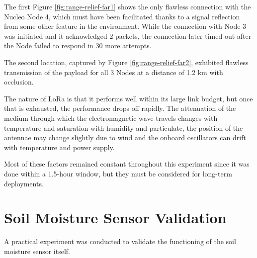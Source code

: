 The first Figure \ref{fig:range-relief-far1} shows the only flawless connection with the Nucleo Node 4, which must have been facilitated thanks to a signal reflection from some other feature in the environment. While the connection with Node 3 was initiated and it acknowledged 2 packets, the connection later timed out after the Node failed to respond in 30 more attempts.

The second location, captured by Figure \ref{fig:range-relief-far2}, exhibited flawless transmission of the payload for all 3 Nodes at a distance of 1.2 km with occlusion.

The nature of LoRa is that it performs well within its large link budget, but once that is exhausted, the performance drops off rapidly. The attenuation of the medium through which the electromagnetic wave travels changes with temperature and saturation with humidity and particulate, the position of the antennae may change slightly due to wind and the onboard oscillators can drift with temperature and power supply.

Most of these factors remained constant throughout this experiment since it was done within a 1.5-hour window, but they must be considered for long-term deployments.

\newpage
\section{\label{section:sensor-validation}Soil Moisture Sensor Validation}
A practical experiment was conducted to validate the functioning of the soil moisture sensor itself.

